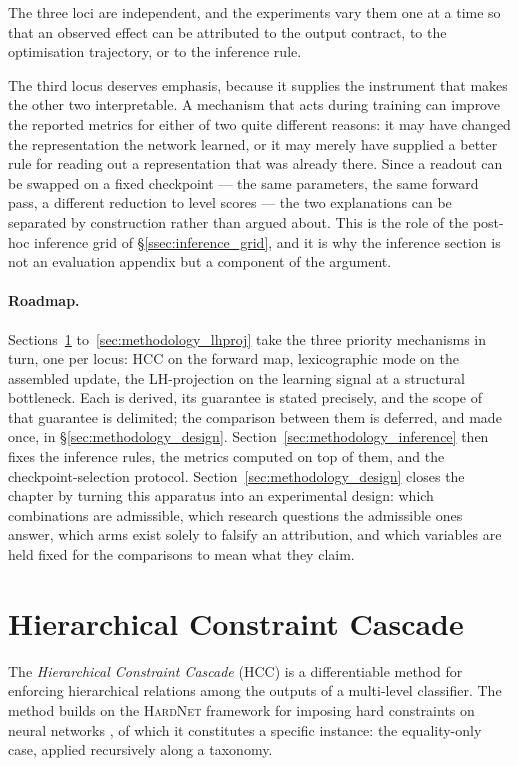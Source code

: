 The three loci are independent, and the experiments vary them one at a time so
that an observed effect can be attributed to the output contract, to the
optimisation trajectory, or to the inference rule.

The third locus deserves emphasis, because it supplies the instrument that makes
the other two interpretable. A mechanism that acts during training can improve the
reported metrics for either of two quite different reasons: it may have changed
the representation the network learned, or it may merely have supplied a better
rule for reading out a representation that was already there. Since a readout can
be swapped on a fixed checkpoint --- the same parameters, the same forward pass,
a different reduction to level scores --- the two explanations can be separated
by construction rather than argued about. This is the role of the post-hoc
inference grid of \S\ref{ssec:inference_grid}, and it is why the inference section
is not an evaluation appendix but a component of the argument.

\paragraph{Roadmap.} Sections~\ref{sec:methodology_hcc}
to~\ref{sec:methodology_lhproj} take the three priority mechanisms in turn, one
per locus: HCC on the forward map, lexicographic mode on the assembled update, the
LH-projection on the learning signal at a structural bottleneck. Each is derived,
its guarantee is stated precisely, and the scope of that guarantee is delimited;
the comparison between them is deferred, and made once, in
\S\ref{sec:methodology_design}. Section~\ref{sec:methodology_inference} then fixes
the inference rules, the metrics computed on top of them, and the
checkpoint-selection protocol. Section~\ref{sec:methodology_design} closes the
chapter by turning this apparatus into an experimental design: which combinations
are admissible, which research questions the admissible ones answer, which arms
exist solely to falsify an attribution, and which variables are held fixed for the
comparisons to mean what they claim.


\section{Hierarchical Constraint Cascade}
\label{sec:methodology_hcc}

The \emph{Hierarchical Constraint Cascade} (HCC) is a differentiable method for enforcing hierarchical relations among the outputs of a multi-level classifier. The method builds on the \textsc{HardNet} framework for imposing hard constraints on neural networks \cite{min2024hardnet}, of which it constitutes a specific instance: the equality-only case, applied recursively along a taxonomy.

